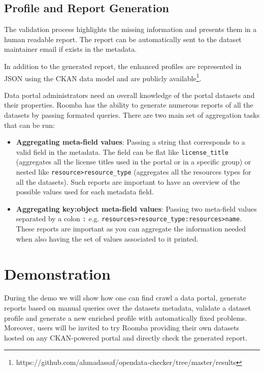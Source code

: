 \documentclass{sig-alternate}
\begin{document}
\subsection{Profile and Report Generation}

The validation process highlights the missing information and presents them in a human readable report. The report can be automatically sent to the dataset maintainer email if exists in the metadata.

In addition to the generated report, the enhanced profiles are represented in JSON using the CKAN data model and are publicly available\footnote{https://github.com/ahmadassaf/opendata-checker/tree/master/results}.

Data portal administrators need an overall knowledge of the portal datasets and their properties. Roomba has the ability to generate numerous reports of all the datasets by passing formated queries. There are two main set of aggregation tasks that can be run:
\begin{itemize}
  \item \textbf{Aggregating meta-field values}: Passing a string that corresponds to a valid field in the metadata. The field can be flat like \texttt{license\_title} (aggregates all the license titles used in the portal or in a specific group) or nested like \texttt{resource>resource\_type} (aggregates all the resources types for all the datasets). Such reports are important to have an overview of the possible values used for each metadata field.
  \item \textbf{Aggregating key:object meta-field values}: Passing two meta-field values separated by a colon \texttt{:} e.g. \texttt{resources>resource\_type:resources>name}. These reports are important as you can aggregate the information needed when also having the set of values associated to it printed.
\end{itemize}

\section{Demonstration}
During the demo we will show how one can find crawl a data portal, generate reports based on manual queries over the datasets metadata, validate a dataset profile and generate a new enriched profile with automatically fixed problems. Moreover, users will be invited to try Roomba providing their own datasets hosted on any CKAN-powered portal and directly check the generated report.
\end{document}
